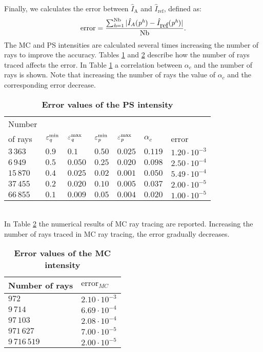Finally, we calculates the error between $\hat{I}_{\textrm{A}}$ and $\hat{I}_{\textrm{ref}}$, defined as:
\begin{equation}\label{eq:error}
\mbox{error} = \frac{\sum_{\textit{h}= 1}^{\textrm{Nb}}| \hat{I}_{A}(\textit{p}^{\textit{h}}) - \hat{I}_{\mbox{ref}}(\textit{p}^{\textit{h}})|}{\textrm{Nb}}.
\end{equation}
The MC and PS intensities are calculated several times increasing the number of rays to improve the accuracy.
Tables \ref{tab:table} and \ref{tab:table2} describe how the number of rays traced affects the error. 
In Table \ref{tab:table} a correlation between $\alpha_c$ and the number of rays is shown.
Note that increasing the number of rays the value of $\alpha_c$ and the corresponding error decrease. 
\begin{table}[htbp] \label{tab:table}
\centering
\caption{\bf Error values of the PS intensity}
\begin{tabular}{lllllll}

 \hline  Number \\ of rays\;  & $\varepsilon^{\textrm{min}}_{\textit{q}} $  & $\varepsilon^{\textrm{max}}_{\textit{q}} $   \;     & $\varepsilon^{\textrm{min}}_{\textit{p}}$\;
  & $\varepsilon^{\textrm{max}}_{\textit{p}}$\; & $\alpha_c$  & error \\
  \hline 
 $3\,363$ & $0.9$  & $0.1$  & $0.50$  & $0.025$ & $0.119$ & $1.20\cdot10^{-3}$ \\
$6\,949$  & $0.5$  & $0.050$  & $0.25$  & $0.020$ & $0.098$ & $2.50\cdot 10^{-4}$  \\
$15\,870$  & $0.4$  & $0.025$  & $0.02$  & $0.001$ & $0.050$ & $5.49\cdot 10^{-4}$ \\
 $37\,455$  & $0.2$  & $0.020$  & $0.10$ & $0.005$ & $0.037$ & $2.00\cdot 10^{-5}$ \\
 $66\,855$ & $0.1$  & $0.009$  & $0.05$  & $0.004$ & $0.020$ & $1.00\cdot 10^{-5}$ \\
 \hline
 \end{tabular}
 \label{tab:table}
 \end{table}
\\ \indent In Table \ref{tab:table2} the numerical results of MC ray tracing are reported.
Increasing the number of rays traced in MC ray tracing, the error gradually decreases.
\begin{table}[htbp]
\centering
\caption{\bf Error values of the MC intensity}
\begin{tabular}{ll} \hline   Number of rays\; & $\mbox{error}_{MC}$\\ \hline $972$  & $2.10\cdot10^{-3}$ \\
$9\,714$  & $6.69\cdot 10^{-4}$  \\ $97\,103$  & $2.08\cdot 10^{-4}$ \\ $971\,627$  & $7.00\cdot 10^{-5}$ \\ $9\,716\,519$  & $2.00\cdot 10^{-5}$ \\
 \hline
 \end{tabular}
 \label{tab:table2}
 \end{table}
